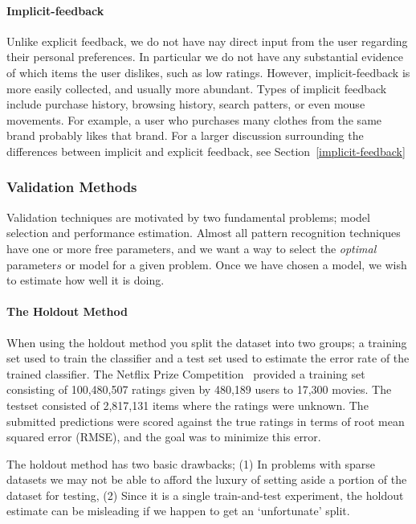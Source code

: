 \paragraph{Implicit-feedback}
Unlike explicit feedback, we do not have nay direct input from the user
regarding their personal preferences. In particular we do not have any
substantial evidence of which items the user dislikes, such as low ratings.
However, implicit-feedback is more easily collected, and usually more abundant.
Types of implicit feedback include purchase history, browsing history, search patters, or even mouse movements. For example, a user who purchases many clothes from the same brand probably likes that brand. For a larger discussion surrounding the differences between
implicit and explicit feedback, see Section~\ref{implicit-feedback}


\subsubsection{Validation Methods}
Validation techniques are motivated by two fundamental problems; model
selection and performance estimation. Almost all pattern recognition techniques
have one or more free parameters, and we want a way to select the
\emph{optimal} parameter\(s\) or model for a given problem. Once we have chosen a
model, we wish to estimate how well it is doing.

\paragraph{The Holdout Method}
When using the holdout method you split the dataset into two groups; a training
set used to train the classifier and a test set used to estimate the error rate
of the trained classifier. The Netflix Prize Competition~\cite{Netflix}
provided a training set consisting of 100,480,507 ratings given by 480,189
users to 17,300 movies. The testset consisted of 2,817,131 items where the
ratings were unknown. The submitted predictions were scored against the true
ratings in terms of root mean squared error (RMSE), and the goal was to
minimize this error.

The holdout method has two basic drawbacks; (1) In problems with sparse
datasets we may not be able to afford the luxury of setting aside a portion of
the dataset for testing, (2) Since it is a single train-and-test experiment,
the holdout estimate can be misleading if we happen to get an `unfortunate'
split.

